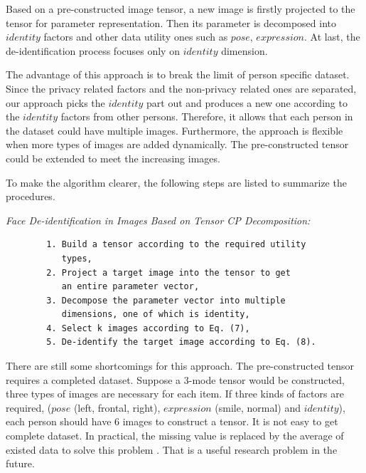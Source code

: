     Based on a pre-constructed image tensor, a new image is firstly projected to
    the tensor for parameter representation. Then its parameter is decomposed into
    $identity$ factors and other data utility ones such as $pose$, $expression$. 
    At last, the de-identification process focuses only on $identity$ dimension. 

    The advantage of this approach is to break the limit of person specific dataset.
    Since the privacy related factors and the non-privacy related ones are separated,
    our approach picks the $identity$ part out and produces a new one 
    according to the $identity$ factors from other persons. Therefore, it allows that
    each person in the dataset could have multiple images. Furthermore, 
    the approach is flexible when more types of images are added dynamically.
    The pre-constructed tensor could be extended to meet the increasing images.

    To make the
    algorithm clearer, the following steps are listed to summarize the procedures.


    \medskip
      \noindent
        {\it Face De-identification in Images Based on Tensor CP Decomposition:}
        \begin{verbatim}
        1. Build a tensor according to the required utility
           types,
        2. Project a target image into the tensor to get
           an entire parameter vector,
        3. Decompose the parameter vector into multiple
           dimensions, one of which is identity,
        4. Select k images according to Eq. (7),
        5. De-identify the target image according to Eq. (8).
        \end{verbatim}
      \noindent

      There are still some shortcomings for this approach. The pre-constructed tensor
      requires a completed dataset. Suppose a $3$-mode tensor would be constructed, three
      types of images are necessary for each item. If three kinds of factors are required,
      ($pose$ (left, frontal, right), $expression$ (smile, normal) and $identity$), each person
      should have 6 images to construct a tensor. It is not easy to get complete dataset.
      In practical, the missing value is replaced by the average of existed data 
      to solve this problem \cite{Feng12}. That is a useful research problem in the future.

%           
